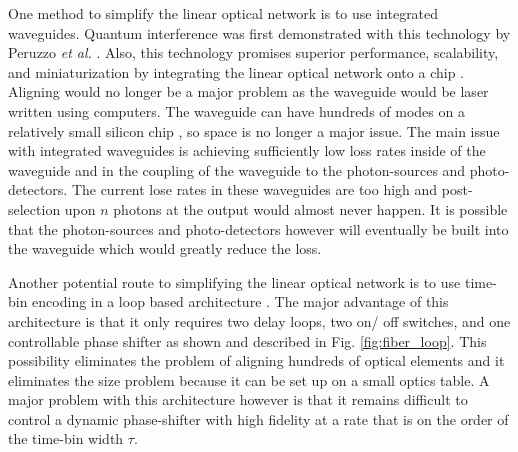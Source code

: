 \documentclass[aps,pra,twocolumn,amsmath,amssymb,nofootinbib,superscriptaddress]{revtex4}
\begin{document}
One method to simplify the linear optical network is to use integrated waveguides. Quantum interference was first demonstrated with this technology by Peruzzo \emph{et al.} \cite{bib:peruzzo2011multimode}. Also, this technology promises superior performance, scalability, and miniaturization by integrating the linear optical network onto a chip \cite{bib:Politi02052008, bib:matthews2009, bib:Politi04092009}. Aligning would no longer be a major problem as the waveguide would be laser written using computers. The waveguide can have hundreds of modes on a relatively small silicon chip \cite{}, so space is no longer a major issue. The main issue with integrated waveguides is achieving sufficiently low loss rates inside of the waveguide and in the coupling of the waveguide to the photon-sources and photo-detectors. The current lose rates in these waveguides are too high and post-selection upon $n$ photons at the output would almost never happen. It is possible that the photon-sources and photo-detectors however will eventually be built into the waveguide which would greatly reduce the loss.   

Another potential route to simplifying the linear optical network is to use time-bin encoding in a loop based architecture \cite{bib:motes2014scalable}. The major advantage of this architecture is that it only requires two delay loops, two on/ off switches, and one controllable phase shifter as shown and described in Fig. \ref{fig:fiber_loop}. This possibility eliminates the problem of aligning hundreds of optical elements and it eliminates the size problem because it can be set up on a small optics table. A major problem with this architecture however is that it remains difficult to control a dynamic phase-shifter with high fidelity at a rate that is on the order of the time-bin width $\tau$.
\end{document}
